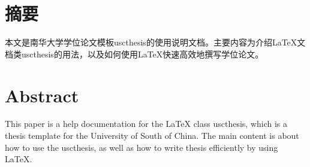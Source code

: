 \maketitle%
\MAKETITLE%
\makedeclaration%
\intobmk\chapter*{摘\quad 要}%
\setcounter{page}{1}%

本文是南华大学学位论文模板uscthesis的使用说明文档。主要内容为介绍\LaTeX{}文档类uscthesis的用法，以及如何使用\LaTeX{}快速高效地撰写学位论文。

\intobmk\chapter*{Abstract}%

This paper is a help documentation for the \LaTeX{} class uscthesis, which is  a thesis template for the University of South of China. The main content is about how to use the uscthesis, as well as how to write thesis efficiently by using \LaTeX{}.

